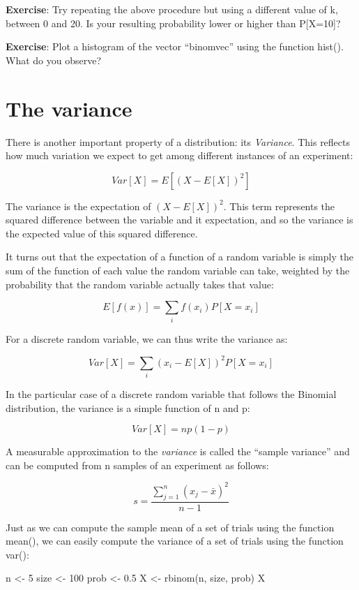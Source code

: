 \documentclass[
]{book}
\newenvironment{Shaded}{\begin{snugshade}}{\end{snugshade}}
\newcommand{\DecValTok}[1]{\textcolor[rgb]{0.00,0.00,0.81}{#1}}
\newcommand{\FloatTok}[1]{\textcolor[rgb]{0.00,0.00,0.81}{#1}}
\newcommand{\FunctionTok}[1]{\textcolor[rgb]{0.00,0.00,0.00}{#1}}
\newcommand{\NormalTok}[1]{#1}
\newcommand{\OtherTok}[1]{\textcolor[rgb]{0.56,0.35,0.01}{#1}}
\begin{document}
\textbf{Exercise}: Try repeating the above procedure but using a different value of k, between 0 and 20. Is your resulting probability lower or higher than P{[}X=10{]}?

\textbf{Exercise}: Plot a histogram of the vector ``binomvec'' using the function hist(). What do you observe?

\hypertarget{the-variance}{%
\section{The variance}\label{the-variance}}

There is another important property of a distribution: its \emph{Variance}. This reflects how much variation we expect to get among different instances of an experiment:

\[Var[X] = E[(X-E[X])^{2}]\]

The variance is the expectation of \((X-E[X])^{2}\). This term represents the squared difference between the variable and it expectation, and so the variance is the expected value of this squared difference.

It turns out that the expectation of a function of a random variable is simply the sum of the function of each value the random variable can take, weighted by the probability that the random variable actually takes that value:

\[E[f(x)] = \sum_{i}f(x_i)P[X=x_i]\]

For a discrete random variable, we can thus write the variance as:

\[Var[X] = \sum_{i}(x_i-E[X])^{2}P[X=x_i]\]

In the particular case of a discrete random variable that follows the Binomial distribution, the variance is a simple function of n and p:

\[Var[X] = n p(1-p)\]

A measurable approximation to the \emph{variance} is called the ``sample variance'' and can be computed from n samples of an experiment as follows:

\[s = \frac{\sum_{j=1}^{n}(x_{j} - \bar{x})^{2}}{n-1}\]

Just as we can compute the sample mean of a set of trials using the function mean(), we can easily compute the variance of a set of trials using the function var():

\begin{Shaded}
\begin{Highlighting}[]
\NormalTok{n }\OtherTok{\textless{}{-}} \DecValTok{5}
\NormalTok{size }\OtherTok{\textless{}{-}} \DecValTok{100}
\NormalTok{prob }\OtherTok{\textless{}{-}} \FloatTok{0.5}
\NormalTok{X }\OtherTok{\textless{}{-}} \FunctionTok{rbinom}\NormalTok{(n, size, prob)}
\NormalTok{X}
\end{Highlighting}
\end{Shaded}
\end{document}
